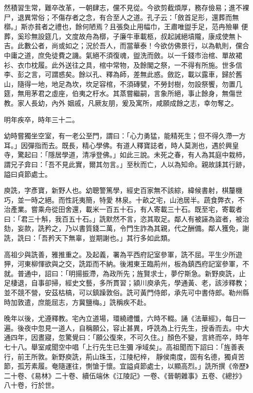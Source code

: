 \begin{pinyinscope}
 然積習生常，難卒改革，一朝肆志，儻不見從。今欲剪截煩厚，務存儉易；進不裸尸，退異常俗；不傷存者之念，有合至人之道。孔子云：「斂首足形，還葬而無槨。」斯亦貧者之禮也，餘何陋焉？且張奐止用幅巾，王肅唯盥手足，范冉殮畢
 便葬，奚珍無設筵几，文度故舟為槨，子廉牛車載柩，叔起誡絕墳隴，康成使無卜吉。此數公者，尚或如之；況於吾人，而當華泰！今欲仿佛景行，以為軌則，儻合中庸之道，庶免徒費之譏。氣絕不須復魂，盥洗而斂。以一千錢市治棺、單故裙衫、衣巾枕履。此外送往之具，棺中常物，及餘閣之祭，一不得有所施。世多信李、彭之言，可謂惑矣。餘以孔、釋為師，差無此惑。斂訖，載以露車，歸於舊山，隨得一地，地足為坎，坎足容棺，不須磚甓，不勞封樹，勿設祭饗，勿置几筵，無用茅君之虛座，伯夷之杅水。其蒸嘗繼嗣，言象所絕，事止餘身，無傷世教。家人長幼，內外
 姻戚，凡厥友朋，爰及寓所，咸願成餘之志，幸勿奪之。



 明年疾卒，時年三十二。



 幼時嘗獨坐空室，有一老公至門，謂曰：「心力勇猛，能精死生；但不得久滯一方耳。」因彈指而去。既長，精心學佛。有道人釋寶誌者，時人莫測也，遇於興皇寺，驚起曰：「隱居學道，清凈登佛。」如此三說。未死之春，有人為其庭中栽柿，謂兄子弇曰：「吾不見此實，爾其勿言。」至秋而亡，人以為知命。親故誄其行跡，謚曰貞節處士。



 庾詵，字彥寶，新野人也。幼聰警篤學，經史百家無不該綜，緯候書射，棋釐機巧，並一時之絕。而性託夷簡，特愛
 林泉。十畝之宅，山池居半。蔬食弊衣，不治產業。嘗乘舟從田舍還，載米一百五十石，有人寄載三十石。既至宅，寄載者曰：「君三十斛，我百五十石。」詵默然不言，恣其取足。鄰人有被誣為盜者，被治劾，妄款，詵矜之，乃以書質錢二萬，令門生詐為其親，代之酬備。鄰人獲免，謝詵，詵曰：「吾矜天下無辜，豈期謝也。」其行多如此類。



 高祖少與詵善，雅推重之。及起義，署為平西府記室參軍，詵不屈。平生少所遊狎，河東柳惲欲與之交，詵距而不納。後湘東王臨荊州，板為鎮西府記室參軍，不就。普通中，詔曰：「明揚振滯，為政所先；旌賢求士，夢佇斯急。新野庾詵，止
 足棲退，自事卻掃，經史文藝，多所貫習；潁川庾承先，學通黃、老，該涉釋教；並不競不營，安茲枯槁，可以鎮躁敦俗。詵可黃門侍郎，承先可中書侍郎。勒州縣時加敦遣，庶能屈志，方冀鹽梅。」詵稱疾不赴。



 晚年以後，尤遵釋教。宅內立道場，環繞禮懺，六時不輟。誦《法華經》，每日一遍。後夜中忽見一道人，自稱願公，容止甚異，呼詵為上行先生，授香而去。中大通四年，因晝寢，忽驚覺曰：「願公復來，不可久住。」顏色不變，言終而卒，時年七十八。舉室咸聞空中唱「上行先生已生彌凈域矣」。高祖聞而下詔曰：「旌善表行，前王所敦。新野庾詵，荊山珠玉，江陵杞梓，
 靜侯南度，固有名德，獨貞苦節，孤芳素履。奄隨運往，惻愴于懷。宜謚貞節處士，以顯高烈。」詵所撰《帝歷》二十卷、《易林》二十卷、續伍端休《江陵記》一卷、《晉朝雜事》五卷、《總抄》八十卷，行於世。




\end{pinyinscope}
